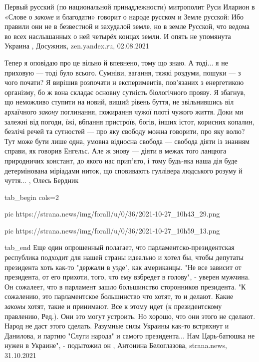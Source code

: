 Первый русский (по национальной принадлежности) митрополит Руси Иларион в
«Слове о \emph{законе} и благодати» говорит о народе русском и Земле русской:
Ибо правили они не в безвестной и захудалой земле, но в земле Русской, что
ведома во всех наслышанных о ней четырёх концах земли.
И опять не упомянута Украина
, Досужник, zen.yandex.ru, 02.08.2021

Тепер я оповідаю про це вільно й впевнено, тому що знаю. А тоді... я не приховую
— тоді було всього. Сумніви, вагання, тяжкі роздуми, пошуки — з чого почати? Я
вирішив розпочати н експериментів, пов’язаних з енергетикою організму, бо ж
вона складає основну сутність біологічного прояву. Я збагнув, що неможливо
ступити на новий, вищий рівень буття, не звільнившись віл архаїчного \emph{закону}
поглинання, пожирання чужої плоті чужого життя. Доки ми залежні від погоди,
їжі, вбпання пристроїв, богів, інших істот, корисних копалин, безлічі речей та
сутностей — про яку свободу можна говорити, про яку волю? Тут може бути лише
одна, умовна відносна свобода — свобода діяти із знанням справи, як говорив
Енгельс. Але ж знову — діяти в межах того ланцюга природничих констант, до
якого нас прип'ято, і тому будь-яка наша дія буде детермінована міріадами
ниток, що сповивають гуллівера людського розуму й чуття...
, Олесь Бердник


\ifcmt
  tab_begin cols=2

     pic https://strana.news/img/forall/u/0/36/2021-10-27_10h43_29.png

     pic https://strana.news/img/forall/u/0/36/2021-10-27_10h59_13.png

  tab_end
\fi
Еще один опрошенный полагает, что парламентско-президентская республика
подходит для нашей страны идеально и хотел бы, чтобы депутаты президента хоть
как-то "держали в узде", как американцы. "Не все зависит от президента, от его
прихоти, того, что ему взбредет в голову", - уверен мужчина.  Он сожалеет, что
в парламент зашло большинство сторонников президента.  "К сожалению, это
парламентское большинство что хотят, то и делают. Какие \emph{законы} хотят, такие и
принимают. Все к этому идет (к президентскому правлению, Ред.). Они это могут
устроить. Но хорошо, что они этого не сделают. Народ не даст этого сделать.
Разумные силы Украины как-то встряхнут и Данилова, и партию "Слуги народа" и
самого президента... Нам Царь-батюшка не нужен в Украине", - подытожил он
, 
Антонина Белоглазова, strana.news, 31.10.2021

